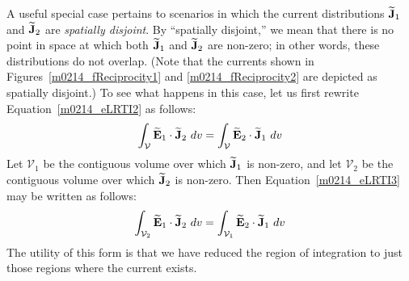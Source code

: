 A useful special case pertains to scenarios in which the current distributions $\widetilde{\bf J}_1$ and $\widetilde{\bf J}_2$ are \emph{spatially disjoint}.  By ``spatially disjoint,'' we mean that there is no point in space at which both $\widetilde{\bf J}_1$ and $\widetilde{\bf J}_2$ are non-zero; in other words, these distributions do not overlap.
(Note that the currents shown in Figures~\ref{m0214_fReciprocity1} and \ref{m0214_fReciprocity2} are depicted as spatially disjoint.)
To see what happens in this case, let us first rewrite Equation~\ref{m0214_eLRTI2} as follows:
%
\begin{equation}
\int_{\mathcal V} { \widetilde{\bf E}_1 \cdot \widetilde{\bf J}_2 ~dv } 
=
\int_{\mathcal V} { \widetilde{\bf E}_2 \cdot \widetilde{\bf J}_1 ~dv } 
\label{m0214_eLRTI3}
\end{equation}
%
Let $\mathcal{V}_1$ be the contiguous volume over which $\widetilde{\bf J}_1$ is non-zero, and 
let $\mathcal{V}_2$ be the contiguous volume over which $\widetilde{\bf J}_2$ is non-zero.
Then Equation~\ref{m0214_eLRTI3} may be written as follows:
%
\begin{equation}
\int_{{\mathcal V}_2} { \widetilde{\bf E}_1 \cdot \widetilde{\bf J}_2 ~dv } 
=
\int_{{\mathcal V}_1} { \widetilde{\bf E}_2 \cdot \widetilde{\bf J}_1 ~dv } 
\label{m0214_eLRTI4}
\end{equation}
%
The utility of this form is that we have reduced the region of integration to just those regions where the current exists.

